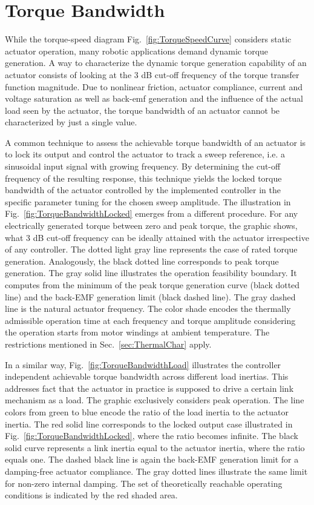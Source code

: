 \documentclass[a4paper,10pt]{cjtdsheet}      %
\begin{document}
\section{Torque Bandwidth}

\begin{multicols}{2}

While the torque-speed diagram Fig.~\ref{fig:TorqueSpeedCurve} considers static actuator operation, many robotic applications demand dynamic torque generation. A way to characterize the dynamic torque generation capability of an actuator consists of looking at the 3 dB cut-off frequency of the torque transfer function magnitude. Due to nonlinear friction, actuator compliance, current and voltage saturation as well as back-emf generation and the influence of the actual load seen by the actuator, the torque bandwidth of an actuator cannot be characterized by just a single value.

A common technique to assess the achievable torque bandwidth of an actuator is to lock its output and control the actuator to track a sweep reference, i.e. a sinusoidal input signal with growing frequency. By determining the cut-off frequency of the resulting response, this technique yields the locked torque bandwidth of the actuator controlled by the implemented controller in the specific parameter tuning for the chosen sweep amplitude. The illustration in Fig.~\ref{fig:TorqueBandwidthLocked} emerges from a different procedure. For any electrically generated torque between zero and peak torque, the graphic shows, what 3 dB cut-off frequency can be ideally attained with the actuator irrespective of any controller. The dotted light gray line represents the case of rated torque generation. Analogously, the black dotted line corresponds to peak torque generation. The gray solid line illustrates the operation feasibility boundary. It computes from the minimum of the peak torque generation curve (black dotted line) and the back-EMF generation limit (black dashed line). The gray dashed line is the natural actuator frequency. The color shade encodes the thermally admissible operation time at each frequency and torque amplitude considering the operation starts from motor windings at ambient temperature. The restrictions mentioned in Sec.~\ref{sec:ThermalChar} apply.

In a similar way, Fig.~\ref{fig:TorqueBandwidthLoad} illustrates the controller independent achievable torque bandwidth across different load inertias. This addresses fact that the actuator in practice is supposed to drive a certain link mechanism as a load. The graphic exclusively considers peak operation. The line colors from green to blue encode the ratio of the load inertia to the actuator inertia. The red solid line corresponds to the locked output case illustrated in Fig.~\ref{fig:TorqueBandwidthLocked}, where the ratio becomes infinite. The black solid curve represents a link inertia equal to the actuator inertia, where the ratio equals one. The dashed black line is again the back-EMF generation limit for a damping-free actuator compliance. The gray dotted lines illustrate the same limit for non-zero internal damping. The set of theoretically reachable operating conditions is indicated by the red shaded area.


\end{multicols}
\end{document}
